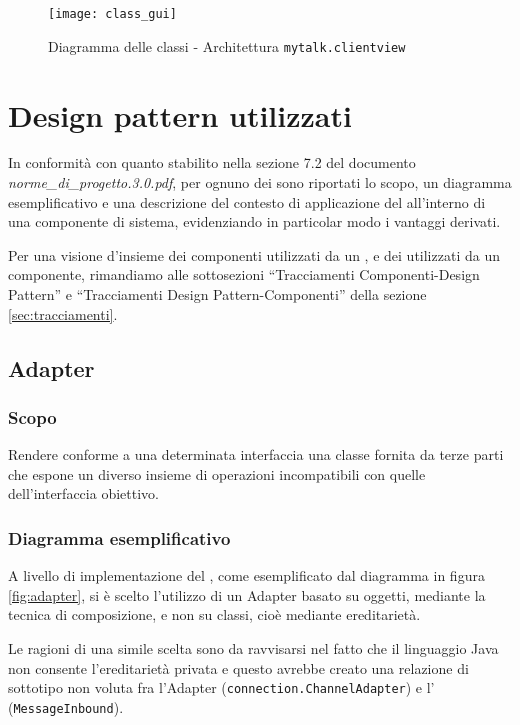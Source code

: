 \begin{figure}[H]
  \centering
  \texttt{[image: class\_gui]}
  \caption{Diagramma delle classi - Architettura \texttt{mytalk.clientview}}\label{fig:sottoarchview}
\end{figure}
\clearpage

\section{Design pattern utilizzati}
In conformità con quanto stabilito nella sezione 7.2 del documento \textit{norme\_di\_progetto.3.0.pdf}, per ognuno dei  sono riportati lo scopo, un diagramma esemplificativo e una descrizione del contesto di applicazione del  all'interno di una componente di sistema, evidenziando in particolar modo i vantaggi derivati.

Per una visione d'insieme dei componenti utilizzati da un , e dei  utilizzati da un componente, rimandiamo alle sottosezioni ``Tracciamenti Componenti-Design Pattern'' e ``Tracciamenti Design Pattern-Componenti'' della sezione \vref{sec:tracciamenti}.

\subsection{Adapter}
\subsubsection{Scopo}
Rendere conforme a una determinata interfaccia una classe fornita da terze parti che espone un diverso insieme di operazioni incompatibili con quelle dell'interfaccia obiettivo.

\subsubsection{Diagramma esemplificativo}
A livello di implementazione del , come esemplificato dal diagramma in figura \ref{fig:adapter}, si è scelto l'utilizzo di un Adapter basato su oggetti, mediante la tecnica di composizione, e non su classi, cioè mediante ereditarietà.

Le ragioni di una simile scelta sono da ravvisarsi nel fatto che il linguaggio Java non consente l'ereditarietà privata e questo avrebbe creato una relazione di sottotipo non voluta fra l'Adapter (\texttt{connection.ChannelAdapter}) e l' (\texttt{MessageInbound}).

